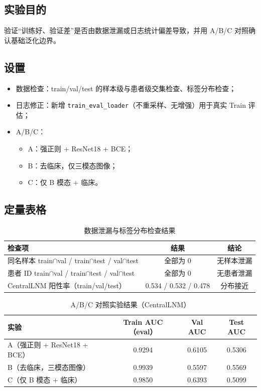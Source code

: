 \documentclass[12pt,a4paper]{ctexart}
\begin{document}
\subsection{实验目的}
验证“训练好、验证差”是否由数据泄漏或日志统计偏差导致，并用 A/B/C 对照确认基础泛化边界。

\subsection{设置}
\begin{itemize}
  \item 数据检查：train/val/test 的样本级与患者级交集检查、标签分布检查；
  \item 日志修正：新增 \texttt{train\_eval\_loader}（不重采样、无增强）用于真实 Train 评估；
  \item A/B/C：
  \begin{itemize}
    \item A：强正则 + ResNet18 + BCE；
    \item B：去临床，仅三模态图像；
    \item C：仅 B 模态 + 临床。
  \end{itemize}
\end{itemize}

\subsection{定量表格}
\begin{table}[H]
\centering
\caption{数据泄漏与标签分布检查结果}
\begin{tabular}{lcc}
\toprule
检查项 & 结果 & 结论 \\
\midrule
同名样本 train$\cap$val / train$\cap$test / val$\cap$test & 全部为 0 & 无样本泄漏 \\
患者 ID train$\cap$val / train$\cap$test / val$\cap$test & 全部为 0 & 无患者泄漏 \\
CentralLNM 阳性率（train/val/test） & 0.534 / 0.532 / 0.478 & 分布接近 \\
\bottomrule
\end{tabular}
\end{table}

\begin{table}[H]
\centering
\caption{A/B/C 对照实验结果（CentralLNM）}
\begin{tabular}{lccc}
\toprule
实验 & Train AUC（eval） & Val AUC & Test AUC \\
\midrule
A（强正则 + ResNet18 + BCE） & 0.9294 & 0.6105 & 0.5306 \\
B（去临床，三模态图像） & 0.9939 & 0.5597 & 0.5569 \\
C（仅 B 模态 + 临床） & 0.9850 & 0.6393 & 0.5099 \\
\bottomrule
\end{tabular}
\end{table}
\end{document}
